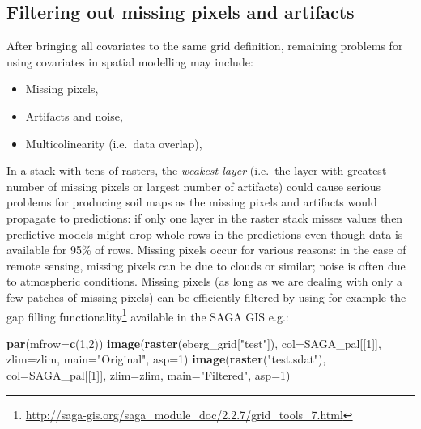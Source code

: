 \documentclass[graybox,natbib,nospthms,UStrade]{svmono}
\newenvironment{Shaded}{\begin{snugshade}}{\end{snugshade}}
\newcommand{\DataTypeTok}[1]{\textcolor[rgb]{0.27,0.27,0.27}{#1}}
\newcommand{\DecValTok}[1]{\textcolor[rgb]{0.06,0.06,0.06}{#1}}
\newcommand{\KeywordTok}[1]{\textcolor[rgb]{0.27,0.27,0.27}{\textbf{#1}}}
\newcommand{\NormalTok}[1]{#1}
\newcommand{\StringTok}[1]{\textcolor[rgb]{0.5,0.5,0.5}{#1}}
\renewcommand{\href}[2]{#2 (\url{#1})}
\renewcommand{\href}[2]{#2\footnote{\url{#1}}}
\begin{document}
\hypertarget{filtering-out-missing-pixels-and-artifacts}{%
\subsection{Filtering out missing pixels and artifacts}\label{filtering-out-missing-pixels-and-artifacts}}

After bringing all covariates to the same grid definition, remaining problems for using covariates in spatial modelling may include:

\begin{itemize}
\item
  Missing pixels,
\item
  Artifacts and noise,
\item
  Multicolinearity (i.e.~data overlap),
\end{itemize}

In a stack with tens of rasters, the \emph{weakest layer} (i.e.~the layer with greatest number of missing pixels or largest number of artifacts) could cause serious problems for producing soil maps as the missing pixels and artifacts would propagate to predictions: if only one layer in the raster stack misses values then predictive models might drop whole rows in the predictions even though data is available for 95\% of rows. Missing pixels occur for various reasons: in the case of remote sensing, missing pixels can be due to clouds or similar; noise is often due to atmospheric conditions. Missing pixels (as long as we are dealing with only a few patches of missing pixels) can be efficiently filtered by using for example the \href{http://saga-gis.org/saga_module_doc/2.2.7/grid_tools_7.html}{gap filling functionality} available in the SAGA GIS e.g.:

\begin{Shaded}
\begin{Highlighting}[]
\KeywordTok{par}\NormalTok{(}\DataTypeTok{mfrow=}\KeywordTok{c}\NormalTok{(}\DecValTok{1}\NormalTok{,}\DecValTok{2}\NormalTok{))}
\KeywordTok{image}\NormalTok{(}\KeywordTok{raster}\NormalTok{(eberg_grid[}\StringTok{"test"}\NormalTok{]), }\DataTypeTok{col=}\NormalTok{SAGA_pal[[}\DecValTok{1}\NormalTok{]], }\DataTypeTok{zlim=}\NormalTok{zlim, }\DataTypeTok{main=}\StringTok{"Original"}\NormalTok{, }\DataTypeTok{asp=}\DecValTok{1}\NormalTok{)}
\KeywordTok{image}\NormalTok{(}\KeywordTok{raster}\NormalTok{(}\StringTok{"test.sdat"}\NormalTok{), }\DataTypeTok{col=}\NormalTok{SAGA_pal[[}\DecValTok{1}\NormalTok{]], }\DataTypeTok{zlim=}\NormalTok{zlim, }\DataTypeTok{main=}\StringTok{"Filtered"}\NormalTok{, }\DataTypeTok{asp=}\DecValTok{1}\NormalTok{)}
\end{Highlighting}
\end{Shaded}
\end{document}

